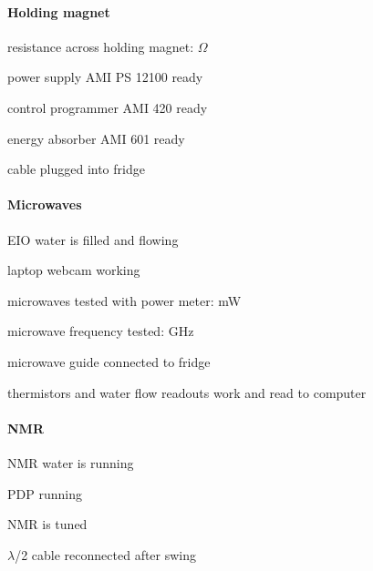 \begin{appendices}
\begin{minipage}{\textwidth}
\paragraph{Holding magnet}
\begin{checklist}
 \item resistance across holding magnet: \blankprompt $\Omega$
 \item power supply AMI PS 12100 ready
 \item control programmer AMI 420 ready
 \item energy absorber AMI 601 ready
 \item cable plugged into fridge
\end{checklist}
\end{minipage}

\begin{minipage}{\textwidth}
\paragraph{Microwaves}
\begin{checklist}
 \item EIO water is filled and flowing
 \item laptop webcam working
 \item microwaves tested with power meter: \blankprompt mW
 \item microwave frequency tested: \blankprompt GHz
 \item microwave guide connected to fridge
 \item thermistors and water flow readouts work and read to computer
\end{checklist}
\end{minipage}

\begin{minipage}{\textwidth}
\paragraph{NMR}
\begin{checklist}
 \item NMR water is running
 \item PDP running
 \item NMR is tuned
 \item $\lambda$/2 cable reconnected after swing
\end{checklist}
\end{minipage}


\end{appendices}
